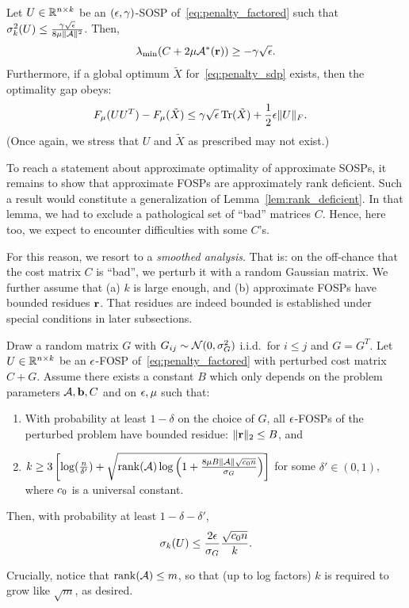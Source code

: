 \begin{lemma}\label{lem:compact_optimal_approx}
	Let $U \in \mathbb{R}^{n\times k}$ be an $(\epsilon, \gamma)$-SOSP of~\eqref{eq:penalty_factored} such that $\sigma_k^2(U) \leq \frac{\gamma \sqrt{\epsilon}}{8 \mu\|\mathcal{A}\|^2}$. Then,
	\begin{align*}
		\lambda_{\min}(C + 2\mu\mathcal{A}^*(\mathbf{r})) \geq -\gamma\sqrt{\epsilon}.
	\end{align*}
	Furthermore, if a global optimum $\tilde X$ for~\eqref{eq:penalty_sdp} exists, then the optimality gap obeys:
	\begin{align*}
		F_\mu(UU^T) - F_\mu(\tilde X) & \leq \gamma \sqrt{\epsilon} \operatorname{Tr}(\tilde X) + \frac{1}{2}\epsilon \|U\|_F.
	\end{align*}
	(Once again, we stress that $U$ and $\tilde X$ as prescribed may not exist.)
\end{lemma} 
To reach a statement about approximate optimality of approximate SOSPs, it remains to show that approximate FOSPs are approximately rank deficient. Such a result would constitute a generalization of Lemma~\ref{lem:rank_deficient}. In that lemma, we had to exclude a pathological set of ``bad'' matrices $C$. Hence, here too, we expect to encounter difficulties with some $C$'s.

For this reason, we resort to a \emph{smoothed analysis}. That is: on the off-chance that the cost matrix $C$ is ``bad'', we perturb it with a random Gaussian matrix. We further assume that (a) $k$ is large enough, and (b) approximate FOSPs have bounded residues $\mathbf{r}$. That residues are indeed bounded is established under special conditions in later subsections.
\begin{theorem}\label{thm:compact_eps_fosp}
	Draw a random matrix $G$ with $G_{ij} \sim \mathcal{N}(0, \sigma_G^2)$ i.i.d.\ for $i \leq j$ and $G = G^T$. Let $U \in \mathbb{R}^{n\times k}$ be an $\epsilon$-FOSP of~\eqref{eq:penalty_factored} with perturbed cost matrix $C+G$. Assume there exists a constant $B$ which only depends on the problem parameters $\mathcal{A}, \mathbf{b}, C$ and on $\epsilon, \mu$ such that:
	\begin{enumerate}
		\item With probability at least $1-\delta$ on the choice of $G$, all $\epsilon$-FOSPs of the perturbed problem have bounded residue: $\|\mathbf{r}\|_2  \leq B$, and
		\item $k \geq 3\left[\log(\frac{n}{\delta'}) + \sqrt{ \operatorname{rank}(\mathcal{A})   \log\left( 1 + \frac{8 \mu B\|\mathcal{A}\| \sqrt{c_0  n}}{\sigma_G } \right) }  \right]$ for some $\delta' \in (0, 1)$, where $c_0$ is a universal constant.
	\end{enumerate}
	Then, with probability at least $1 - \delta - \delta'$,
	\begin{align*}
	\sigma_k(U) \leq \frac{ 2\epsilon}{\sigma_G } \frac{\sqrt{c_0 n}}{k}.
	\end{align*}
\end{theorem}
Crucially, notice that $\operatorname{rank}(\mathcal{A}) \leq m$, so that (up to log factors) $k$ is required to grow like $\sqrt{m}$, as desired.





